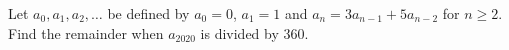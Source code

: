 Let $a_0,a_1,a_2,\dots$ be defined by $a_0=0$, $a_1=1$ and $a_n=3a_{n-1}+5a_{n-2}$ for $n\ge2$. Find the remainder when $a_{2020}$ is divided by $360$.
